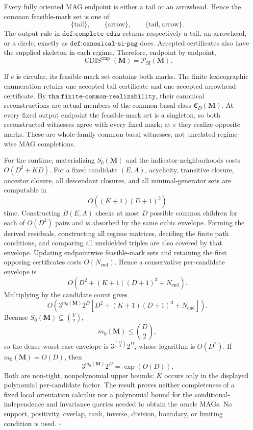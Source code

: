 Every fully oriented MAG endpoint is either a tail or an arrowhead.  Hence the common feasible-mark set is one of
\[
\{\mathrm{tail}\},
\qquad
\{\mathrm{arrow}\},
\qquad
\{\mathrm{tail},\mathrm{arrow}\}.
\]
The output rule in \(\texttt{def:complete-cdis}\) returns respectively a tail, an arrowhead, or a circle, exactly as \(\texttt{def:canonical-si-pag}\) does.  Accepted certificates also have the supplied skeleton in each regime.  Therefore, endpoint by endpoint,
\[
\operatorname{CDIS}^{\mathrm{cmp}}(\mathbf M)
=\mathcal P_{\mathrm{SI}}(\mathbf M).
\]

If \(e\) is circular, its feasible-mark set contains both marks.  The finite lexicographic enumeration retains one accepted tail certificate and one accepted arrowhead certificate.  By \(\texttt{thm:finite-common-realizability}\), their canonical reconstructions are actual members of the common-basal class \(\mathfrak C_D(\mathbf M)\).  At every fixed output endpoint the feasible-mark set is a singleton, so both reconstructed witnesses agree with every fixed mark; at \(e\) they realize opposite marks.  These are whole-family common-basal witnesses, not unrelated regime-wise MAG completions.

For the runtime, materializing \(S_0(\mathbf M)\) and the indicator-neighborhoods costs \(O(D^2+KD)\).  For a fixed candidate \((E,A)\), acyclicity, transitive closure, ancestor closure, all descendant closures, and all minimal-generator sets are computable in
\[
O((K+1)(D+1)^3)
\]
time.  Constructing \(B(E,A)\) checks at most \(D\) possible common children for each of \(O(D^2)\) pairs and is absorbed by the same cubic envelope.  Forming the derived residuals, constructing all regime matrices, deciding the finite path conditions, and comparing all unshielded triples are also covered by that envelope.  Updating endpointwise feasible-mark sets and retaining the first opposing certificates costs \(O(N_{\mathrm{end}})\).  Hence a conservative per-candidate envelope is
\[
O\!\left(D^2+(K+1)(D+1)^3+N_{\mathrm{end}}\right).
\]
Multiplying by the candidate count gives
\[
O\!\left(3^{m_0(\mathbf M)}2^D
\left[D^2+(K+1)(D+1)^3+N_{\mathrm{end}}\right]\right).
\]
Because \(S_0(\mathbf M)\subseteq\binom V2\),
\[
m_0(\mathbf M)\le\binom D2,
\]
so the dense worst-case envelope is \(3^{\binom D2}2^D\), whose logarithm is \(O(D^2)\).  If \(m_0(\mathbf M)=O(D)\), then
\[
3^{m_0(\mathbf M)}2^D=\exp(O(D)).
\]
Both are non-tight, nonpolynomial upper bounds; \(K\) occurs only in the displayed polynomial per-candidate factor.  The result proves neither completeness of a fixed local orientation calculus nor a polynomial bound for the conditional-independence and invariance queries needed to obtain the oracle MAGs.  No support, positivity, overlap, rank, inverse, division, boundary, or limiting condition is used. \(\square\)
